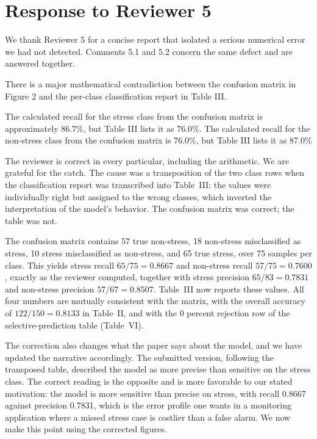 \section*{Response to Reviewer 5}

We thank Reviewer 5 for a concise report that isolated a serious
numerical error we had not detected. Comments 5.1 and 5.2 concern the
same defect and are answered together.


\begin{reviewercomment}
There is a major mathematical contradiction between the confusion matrix
in Figure 2 and the per-class classification report in Table III.

The calculated recall for the stress class from the confusion matrix is
approximately 86.7\%, but Table III lists it as 76.0\%. The calculated
recall for the non-stress class from the confusion matrix is 76.0\%, but
Table III lists it as 87.0\%
\end{reviewercomment}

\response The reviewer is correct in every particular, including the
arithmetic. We are grateful for the catch. The cause was a transposition
of the two class rows when the classification report was transcribed into
Table~III: the values were individually right but assigned to the wrong
classes, which inverted the interpretation of the model's behavior. The
confusion matrix was correct; the table was not.

The confusion matrix contains 57 true non-stress, 18 non-stress
misclassified as stress, 10 stress misclassified as non-stress, and 65
true stress, over 75 samples per class. This yields stress recall
$65/75 = 0.8667$ and non-stress recall $57/75 = 0.7600$, exactly as the
reviewer computed, together with stress precision $65/83 = 0.7831$ and
non-stress precision $57/67 = 0.8507$. Table~III now reports these
values. All four numbers are mutually consistent with the matrix, with
the overall accuracy of $122/150 = 0.8133$ in Table~II, and with the
0 percent rejection row of the selective-prediction table (Table~VI).

The correction also changes what the paper says about the model, and we
have updated the narrative accordingly. The submitted version, following
the transposed table, described the model as more precise than sensitive
on the stress class. The correct reading is the opposite and is more
favorable to our stated motivation: the model is more sensitive than
precise on stress, with recall 0.8667 against precision 0.7831, which is
the error profile one wants in a monitoring application where a missed
stress case is costlier than a false alarm. We now make this point using
the corrected figures.

